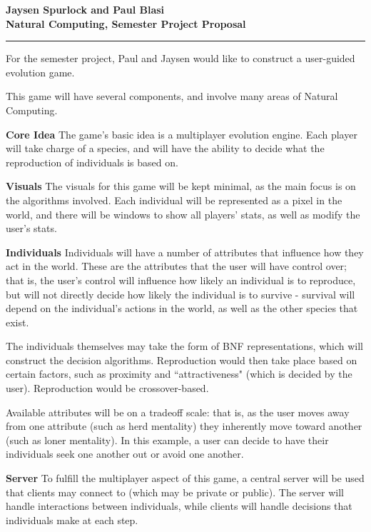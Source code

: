 \documentclass[11pt]{article}
\newcommand{\HWKtitle}[2]
{
	\begin{center}
	
	\textbf
	{
		#1 \\
		#2, Semester Project Proposal
	}
	
	\end{center}
	\medskip
	\hrule
	\bigskip
}
\begin{document}
    \HWKtitle{Jaysen Spurlock and Paul Blasi}{Natural Computing}

    For the semester project, Paul and Jaysen would like to construct a user-guided evolution game.

    This game will have several components, and involve many areas of Natural Computing.
    \begin{description}
        \item{\textbf{Core Idea}}
            The game's basic idea is a multiplayer evolution engine. Each player will take charge of a species, and will have the ability to decide what the
            reproduction of individuals is based on.
            
        \item{\textbf{Visuals}}
            The visuals for this game will be kept minimal, as the main focus is on the algorithms involved. Each individual will be represented as a pixel in the world,
            and there will be windows to show all players' stats, as well as modify the user's stats.

        \item{\textbf{Individuals}}
            Individuals will have a number of attributes that influence how they act in the world. These are the attributes that the user will have control over; that is,
            the user's control will influence how likely an individual is to reproduce, but will not directly decide how likely the individual is to survive - survival will
            depend on the individual's actions in the world, as well as the other species that exist.

            The individuals themselves may take the form of BNF representations, which will construct the decision algorithms. Reproduction would then take place based on
            certain factors, such as proximity and ``attractiveness" (which is decided by the user). Reproduction would be crossover-based.

            Available attributes will be on a tradeoff scale: that is, as the user moves away from one attribute (such as herd mentality) they inherently move toward
            another (such as loner mentality). In this example, a user can decide to have their individuals seek one another out or avoid one another.

        \item{\textbf{Server}}
            To fulfill the multiplayer aspect of this game, a central server will be used that clients may connect to (which may be private or public). The server will
            handle interactions between individuals, while clients will handle decisions that individuals make at each step.
    \end{description}
\end{document}
